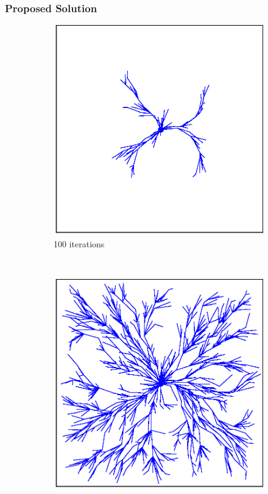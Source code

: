 \documentclass{beamer}
\begin{document}
\begin{frame}
    \frametitle{Proposed Solution}
     
    \begin{figure}[!ht]
		\centering
		\begin{subfigure}[b]{0.3\textwidth}
			\includegraphics[width=\textwidth]{figChap3/RRTstar_expansion100.eps}
			\caption{100 iterations}
		\end{subfigure}
		~ %
		\begin{subfigure}[b]{0.3\textwidth}
			\includegraphics[width=\textwidth]{figChap3/RRTstar_expansion1000.eps}

\end{subfigure}
\end{figure}
\end{frame}
\end{document}
